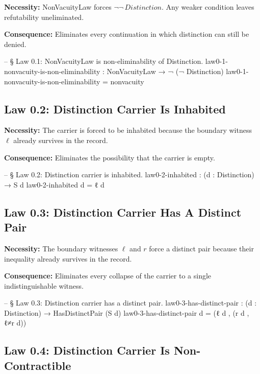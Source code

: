 \documentclass[11pt,a4paper]{book}
\def\texttt#1{#1}%
\begin{document}
\textbf{Necessity:} \texttt{NonVacuityLaw} forces $\neg\neg\, \mathit{Distinction}$. Any weaker condition leaves refutability uneliminated.

\textbf{Consequence:} Eliminates every continuation in which distinction can still be denied.

\begin{code}
-- § Law 0.1: NonVacuityLaw is non-eliminability of Distinction.
law0-1-nonvacuity-is-non-eliminability :
  NonVacuityLaw → ¬ (¬ Distinction)
law0-1-nonvacuity-is-non-eliminability = nonvacuity
\end{code}

\subsection{Law 0.2: Distinction Carrier Is Inhabited}

\textbf{Necessity:} The carrier is forced to be inhabited because the boundary witness $\ell$ already survives in the record.

\textbf{Consequence:} Eliminates the possibility that the carrier is empty.

\begin{code}
-- § Law 0.2: Distinction carrier is inhabited.
law0-2-inhabited : (d : Distinction) → S d
law0-2-inhabited d = ℓ d
\end{code}

\subsection{Law 0.3: Distinction Carrier Has A Distinct Pair}

\textbf{Necessity:} The boundary witnesses $\ell$ and $r$ force a distinct pair because their inequality already survives in the record.

\textbf{Consequence:} Eliminates every collapse of the carrier to a single indistinguishable witness.

\begin{code}
-- § Law 0.3: Distinction carrier has a distinct pair.
law0-3-has-distinct-pair : (d : Distinction) → HasDistinctPair (S d)
law0-3-has-distinct-pair d = (ℓ d , (r d , ℓ≠r d))
\end{code}

\subsection{Law 0.4: Distinction Carrier Is Non-Contractible}
\end{document}
